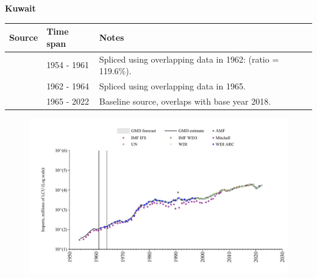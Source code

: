 \documentclass[12pt,a4paper,landscape]{article}
\begin{document}
\begin{adjustbox}{max totalsize={\paperwidth}{\paperheight},center}
\begin{minipage}[t][\textheight][t]{\textwidth}
\vspace*{0.5cm}
{}
\begin{center}
{\Large\bfseries Kuwait}
\end{center}
\vspace{0.5cm}
\begin{table}[H]
\centering
\small
\begin{tabular}{|l|l|l|}
\hline
\textbf{Source} & \textbf{Time span} & \textbf{Notes} \\
\hline
\rowcolor{white}\cite{Mitchell}& 1954 - 1961 &Spliced using overlapping data in 1962: (ratio = 119.6\%).\\
\rowcolor{lightgray}\cite{WDI_ARC}& 1962 - 1964 &Spliced using overlapping data in 1965.\\
\rowcolor{white}\cite{WDI}& 1965 - 2022 &Baseline source, overlaps with base year 2018.\\
\hline
\end{tabular}
\end{table}
\begin{figure}[H]
\centering
\includegraphics[width=\textwidth,height=0.6\textheight,keepaspectratio]{graphs/KWT_imports.pdf}
\end{figure}
\end{minipage}
\end{adjustbox}
\end{document}
